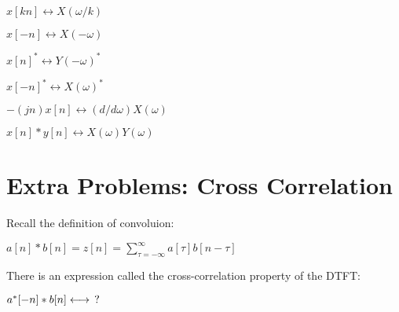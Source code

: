 \documentclass[11pt]{article}
\begin{document}
\begin{center}

$
x[kn]  \longleftrightarrow  X(\omega / k)
$
\end{center}
\begin{center}

$
x[-n]  \longleftrightarrow  X(-\omega)
$
\end{center}
\begin{center}

$
x[n]^{*} \longleftrightarrow  Y(-\omega)^{*}
$
\end{center}
\begin{center}

$
x[-n]^{*} \longleftrightarrow  X(\omega)^{*}
$
\end{center}

\begin{center}

$
-(j n) x[n] \longleftrightarrow (d/d\omega) X(\omega)
$
\end{center}

\begin{center}

$
x[n] * y[n] \longleftrightarrow X(\omega) Y(\omega)
$
\end{center}



\newpage

\section{Extra Problems: Cross Correlation}

Recall the definition of convoluion:
\vspace{1mm}
\begin{center}
$
a[n] * b[n] = z[n] =  \sum_{\tau = -\infty}^{\infty} a[\tau] b[n - \tau]
$

\end{center}

\vspace{4mm}

There is an expression called the cross-correlation property of the DTFT:
\vspace{3mm}
\begin{center}
$
a^{*}[-n] * b[n] \longleftrightarrow \hspace{1.5mm} ?
$

\end{center}

\vspace{5mm}
\end{document}
